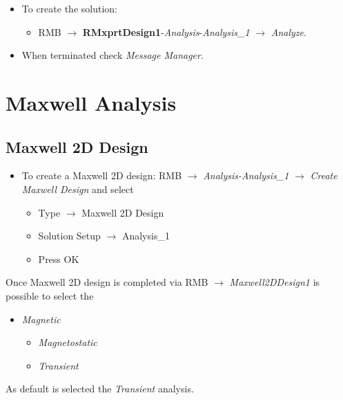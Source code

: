 \begin{mybox}
	\begin{itemize}
		\item[--] To create the solution: 
		\begin{itemize}
			\item[--] RMB $\rightarrow$ \textbf{RMxprtDesign1}-\textit{Analysis}-\textit{Analysis\_1} $\rightarrow$ \textit{Analyze}.
		\end{itemize}
		\item[--] When terminated check \textit{Message Manager}. 
	\end{itemize}
\end{mybox}



\chapter{Maxwell Analysis}
\section{Maxwell 2D Design} 

\begin{itemize}
	\item[--] To create a Maxwell 2D design: RMB $\rightarrow$ \textit{Analysis-Analysis\_1} $\rightarrow$ \textit{Create Maxwell Design} and select
	\begin{itemize}
		\item[--] Type $\rightarrow$ Maxwell 2D Design
		\item[--] Solution Setup $\rightarrow$ Analysis\_1
		\item[--] Press OK
	\end{itemize}
\end{itemize}

\begin{mybox}
	Once Maxwell 2D design is completed via RMB $\rightarrow$ \textit{Maxwell2DDesign1} is possible to select the 
	\begin{itemize}
		\item[--] \textit{Magnetic}
		\begin{itemize}
			\item[--] \textit{Magnetostatic}
			\item[--] \textit{Transient}
		\end{itemize}
	\end{itemize}
	As default is selected the \textit{Transient} analysis.
\end{mybox}


